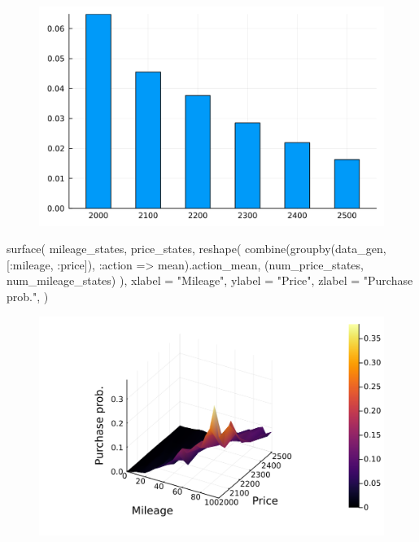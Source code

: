 \documentclass[
  letterpaper,
  DIV=11,
  numbers=noendperiod]{scrreprt}
\newenvironment{Shaded}{\begin{snugshade}}{\end{snugshade}}
\newcommand{\FunctionTok}[1]{\textcolor[rgb]{0.28,0.35,0.67}{#1}}
\newcommand{\NormalTok}[1]{\textcolor[rgb]{0.00,0.23,0.31}{#1}}
\newcommand{\OperatorTok}[1]{\textcolor[rgb]{0.37,0.37,0.37}{#1}}
\newcommand{\StringTok}[1]{\textcolor[rgb]{0.13,0.47,0.30}{#1}}
\begin{document}
\begin{figure}[H]

{\centering \includegraphics{./single_agent_dynamic_basic_files/figure-pdf/cell-23-output-1.svg}

}

\end{figure}

\begin{Shaded}
\begin{Highlighting}[]
\FunctionTok{surface}\NormalTok{(}
\NormalTok{    mileage\_states,}
\NormalTok{    price\_states,}
    \FunctionTok{reshape}\NormalTok{(}
        \FunctionTok{combine}\NormalTok{(}\FunctionTok{groupby}\NormalTok{(data\_gen, [}\OperatorTok{:}\NormalTok{mileage, }\OperatorTok{:}\NormalTok{price]), }\OperatorTok{:}\NormalTok{action }\OperatorTok{=\textgreater{}}\NormalTok{ mean).action\_mean, }
\NormalTok{        (num\_price\_states, num\_mileage\_states)}
\NormalTok{    ),}
\NormalTok{    xlabel }\OperatorTok{=} \StringTok{"Mileage"}\NormalTok{,}
\NormalTok{    ylabel }\OperatorTok{=} \StringTok{"Price"}\NormalTok{,}
\NormalTok{    zlabel }\OperatorTok{=} \StringTok{"Purchase prob."}\NormalTok{,}
\NormalTok{)}
\end{Highlighting}
\end{Shaded}

\begin{figure}[H]

{\centering \includegraphics{./single_agent_dynamic_basic_files/figure-pdf/cell-24-output-1.svg}

}

\end{figure}
\end{document}
